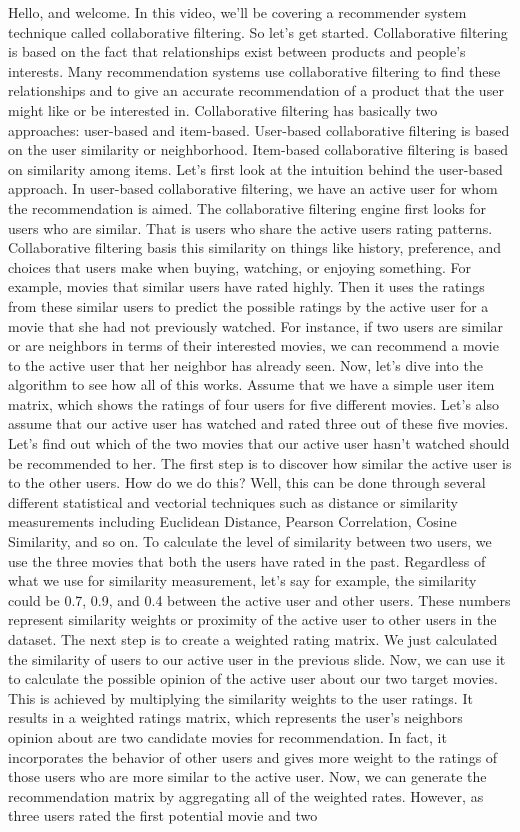 	
	Hello, and welcome. In this video, we'll be covering a recommender system technique called collaborative filtering. So let's get started. Collaborative filtering is based on the fact that relationships exist between products and people's interests. Many recommendation systems use collaborative filtering to find these relationships and to give an accurate recommendation of a product that the user might like or be interested in. Collaborative filtering has basically two approaches: user-based and item-based. User-based collaborative filtering is based on the user similarity or neighborhood. Item-based collaborative filtering is based on similarity among items. Let's first look at the intuition behind the user-based approach. In user-based collaborative filtering, we have an active user for whom the recommendation is aimed. The collaborative filtering engine first looks for users who are similar. That is users who share the active users rating patterns. Collaborative filtering basis this similarity on things like history, preference, and choices that users make when buying, watching, or enjoying something. For example, movies that similar users have rated highly. Then it uses the ratings from these similar users to predict the possible ratings by the active user for a movie that she had not previously watched. For instance, if two users are similar or are neighbors in terms of their interested movies, we can recommend a movie to the active user that her neighbor has already seen. Now, let's dive into the algorithm to see how all of this works. Assume that we have a simple user item matrix, which shows the ratings of four users for five different movies. Let's also assume that our active user has watched and rated three out of these five movies. Let's find out which of the two movies that our active user hasn't watched should be recommended to her. The first step is to discover how similar the active user is to the other users. How do we do this? Well, this can be done through several different statistical and vectorial techniques such as distance or similarity measurements including Euclidean Distance, Pearson Correlation, Cosine Similarity, and so on. To calculate the level of similarity between two users, we use the three movies that both the users have rated in the past. Regardless of what we use for similarity measurement, let's say for example, the similarity could be 0.7, 0.9, and 0.4 between the active user and other users. These numbers represent similarity weights or proximity of the active user to other users in the dataset. The next step is to create a weighted rating matrix. We just calculated the similarity of users to our active user in the previous slide. Now, we can use it to calculate the possible opinion of the active user about our two target movies. This is achieved by multiplying the similarity weights to the user ratings. It results in a weighted ratings matrix, which represents the user's neighbors opinion about are two candidate movies for recommendation. In fact, it incorporates the behavior of other users and gives more weight to the ratings of those users who are more similar to the active user. Now, we can generate the recommendation matrix by aggregating all of the weighted rates. However, as three users rated the first potential movie and two 